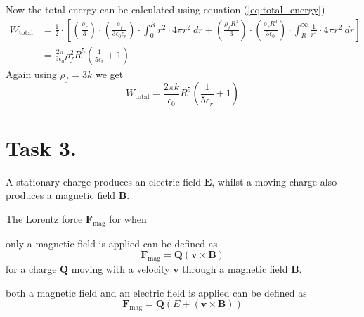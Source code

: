 \documentclass[a4paper,11pt]{article}
\begin{document}
\begin{alphalist}
        Now the total energy can be calculated using equation (\ref{eq:total_energy})
        \begin{align*}
            W_{\text{total}} &= \frac{1}{2} \cdot \left[\left(\frac{\rho_f}{3}\right) \cdot \left(\frac{\rho_f}{3\epsilon_0\epsilon_r}\right) \cdot \int_0^R r^2 \cdot 4\pi r^2 \:dr 
            + \left(\frac{\rho_f R^3}{3}\right) \cdot \left(\frac{\rho_f R^3}{3\epsilon_0}\right) \cdot \int_{R}^{\infty} \frac{1}{r^4} \cdot 4\pi r^2 \:dr\right] \\
                             &= \frac{2\pi}{9\epsilon_0} \rho_f^2 R^5 \left(\frac{1}{5\epsilon_r} + 1\right)
        \end{align*}
        Again using $\rho_f = 3k$ we get
        \[
            W_{\text{total}} = \frac{2\pi k}{\epsilon_0} R^5 \left(\frac{1}{5\epsilon_r} + 1\right)
        \]

\end{alphalist}

\section*{Task 3.}
\begin{alphalist}
    \item A stationary charge produces an electric field $\mathbf{E}$, whilst a moving charge also produces a magnetic field $\mathbf{B}$.
    \item The Lorentz force $\mathbf{F}_{\text{mag}}$ for when
        \begin{romanlist}
            \item only a magnetic field is applied can be defined as
                \[
                    \mathbf{F}_{\text{mag}} = \mathbf{Q}(\mathbf{v} \times \mathbf{B})
                \]
                for a charge $\mathbf{Q}$ moving with a velocity $\mathbf{v}$ through a magnetic field $\mathbf{B}$.
            \item both a magnetic field and an electric field is applied can be defined as
                \[
                    \mathbf{F}_{\text{mag}} = \mathbf{Q}(E + \left(\mathbf{v} \times \mathbf{B}\right))
                \]
        \end{romanlist}
\end{alphalist}
\end{document}
